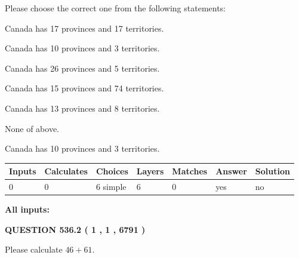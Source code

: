 \documentclass[12pt]{article}
\begin{document}
  
Please choose the correct one from the following statements:
 
 
Canada has  17 provinces and  17 territories.
 
 
Canada has 10  provinces and 3 territories.
 
 
Canada has  26 provinces and  5 territories.
 
 
Canada has  15 provinces and  74 territories.
 
 
Canada has  13 provinces and  8 territories.
 
 
 None of above.
 
 
\noindent{}
 
 
Canada has 10  provinces and 3 territories.
 
 
\noindent{}
 
 
   
   
   
   
\noindent\begin{tabular}{|l|l|l|l|l|l|l|}
 \hline
Inputs & Calculates & Choices & Layers & Matches & Answer & Solution \\ \hline
 0  & 
 0  & 
 6
  simple  
  & 
 6  & 
 0  & 
  yes & 
  no 
  \\ \hline
 \end{tabular}
   
   
   
   
\noindent{}
   
   
   
   
\noindent\vspace{0.1in}\hspace{-0.08in} {\textbf{\Large{All inputs: }}}
   
   
  
\vspace{0.2in}
  
{\textbf{\Large{QUESTION
536.2 
 ( 1 , 1 , 6791 )
}}}
  
  
 
Please calculate $ %
46 +  %
61 $.
 
 
 
\end{document}
